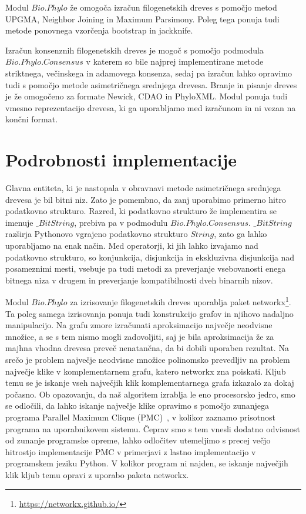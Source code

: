 \documentclass[a4paper, 12pt]{book}
\begin{document}
Modul $Bio.Phylo$ že omogoča izračun filogenetskih dreves s pomočjo metod UPGMA, Neighbor Joining in Maximum Parsimony. Poleg tega ponuja tudi metode ponovnega vzorčenja bootstrap in jackknife.  

Izračun konsenznih filogenetskih dreves je mogoč s pomočjo podmodula $Bio.Phylo.Consensus$ v katerem so bile najprej implementirane metode striktnega, večinskega in adamovega konsenza, sedaj pa izračun lahko opravimo tudi s pomočjo metode asimetričnega srednjega drevesa. Branje in pisanje dreves je že omogočeno za formate Newick, CDAO in PhyloXML. Modul ponuja tudi vmesno reprezentacijo drevesa, ki ga uporabljamo med izračunom in ni vezan na končni format.

\section{Podrobnosti implementacije}
Glavna entiteta, ki je nastopala v obravnavi metode asimetričnega srednjega drevesa je bil bitni niz. Zato je pomembno, da zanj uporabimo primerno hitro podatkovno strukturo. Razred, ki podatkovno strukturo že implementira se imenuje $\_BitString$, prebiva pa v podmodulu $Bio.Phylo.Consensus$. $\_BitString$ razširja Pythonovo vgrajeno podatkovno strukturo $String$, zato ga lahko uporabljamo na enak način. Med operatorji, ki jih lahko izvajamo nad podatkovno strukturo, so konjunkcija, disjunkcija in ekskluzivna disjunkcija nad posameznimi mesti, vsebuje pa tudi metodi za preverjanje vsebovanosti enega bitnega niza v drugem in preverjanje kompatibilnosti dveh binarnih nizov. 

Modul $Bio.Phylo$ za izrisovanje filogenetskih dreves uporablja paket networkx\footnote{\url{https://networkx.github.io/}}. 
Ta poleg samega izrisovanja ponuja tudi konstrukcijo grafov in njihovo nadaljno manipulacijo. Na grafu zmore izračunati 
aproksimacijo največje neodvisne množice, a se s tem nismo mogli zadovoljiti, saj je bila aproksimacija že za majhna 
vhodna drevesa preveč nenatančna, da bi dobili uporaben rezultat. Na srečo je problem največje neodvisne množice polinomsko
prevedljiv na problem največje klike v komplementarnem grafu, katero networkx zna poiskati. Kljub temu se je iskanje vseh največjih
klik komplementarnega grafa izkazalo za dokaj počasno. Ob opazovanju, da naš algoritem izrablja le eno procesorsko jedro, smo
se odločili, da lahko iskanje največje klike opravimo s pomočjo zunanjega programa Parallel Maximum Clique (PMC)~\cite{pmc}, v 
kolikor zaznamo prisotnost programa na uporabnikovem sistemu. Čeprav smo s tem vnesli dodatno odvisnost od zunanje programske opreme, 
lahko odločitev utemeljimo s precej večjo hitrostjo implementacije PMC v primerjavi z lastno implementacijo v programskem jeziku 
Python. V kolikor program ni najden, se iskanje največjih klik kljub temu opravi z uporabo paketa networkx.
\end{document}

